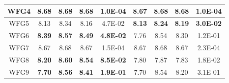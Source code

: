 \begin{table}[t]
\begin{center}
\begin{scriptsize}
\begin{tabular}{ccccccccc}
\multicolumn{1}{|c|}{WFG4} & \multicolumn{1}{c|}{8.68}           & \multicolumn{1}{c|}{8.68}           & \multicolumn{1}{c|}{8.68}           & \multicolumn{1}{c|}{1.0E-04}          & \multicolumn{1}{c|}{8.67}          & \multicolumn{1}{c|}{8.68}          & \multicolumn{1}{c|}{8.68}          & \multicolumn{1}{c|}{1.0E-04}          \\ \hline
\multicolumn{1}{|c|}{WFG5} & \multicolumn{1}{c|}{8.13}           & \multicolumn{1}{c|}{8.34}           & \multicolumn{1}{c|}{8.16}           & \multicolumn{1}{c|}{4.7E-02}          & \multicolumn{1}{c|}{\textbf{8.13}} & \multicolumn{1}{c|}{\textbf{8.24}} & \multicolumn{1}{c|}{\textbf{8.19}} & \multicolumn{1}{c|}{\textbf{3.0E-02}} \\ \hline
\multicolumn{1}{|c|}{WFG6} & \multicolumn{1}{c|}{\textbf{8.39}}  & \multicolumn{1}{c|}{\textbf{8.57}}  & \multicolumn{1}{c|}{\textbf{8.49}}  & \multicolumn{1}{c|}{\textbf{4.8E-02}} & \multicolumn{1}{c|}{7.76}          & \multicolumn{1}{c|}{8.54}          & \multicolumn{1}{c|}{8.30}          & \multicolumn{1}{c|}{1.2E-01}          \\ \hline
\multicolumn{1}{|c|}{WFG7} & \multicolumn{1}{c|}{8.67}           & \multicolumn{1}{c|}{8.68}           & \multicolumn{1}{c|}{8.67}           & \multicolumn{1}{c|}{1.5E-04}          & \multicolumn{1}{c|}{8.67}          & \multicolumn{1}{c|}{8.68}          & \multicolumn{1}{c|}{8.67}          & \multicolumn{1}{c|}{2.3E-04}          \\ \hline
\multicolumn{1}{|c|}{WFG8} & \multicolumn{1}{c|}{\textbf{8.20}}  & \multicolumn{1}{c|}{\textbf{8.60}}  & \multicolumn{1}{c|}{\textbf{8.54}}  & \multicolumn{1}{c|}{\textbf{8.5E-02}} & \multicolumn{1}{c|}{7.80}          & \multicolumn{1}{c|}{7.87}          & \multicolumn{1}{c|}{7.83}          & \multicolumn{1}{c|}{1.8E-02}          \\ \hline
\multicolumn{1}{|c|}{WFG9} & \multicolumn{1}{c|}{\textbf{7.70}}  & \multicolumn{1}{c|}{\textbf{8.56}}  & \multicolumn{1}{c|}{\textbf{8.41}}  & \multicolumn{1}{c|}{\textbf{1.9E-01}} & \multicolumn{1}{c|}{7.70}          & \multicolumn{1}{c|}{8.54}          & \multicolumn{1}{c|}{8.20}          & \multicolumn{1}{c|}{3.1E-01}          \\ \hline



\end{tabular}
\end{scriptsize}
\end{center}
\end{table}
